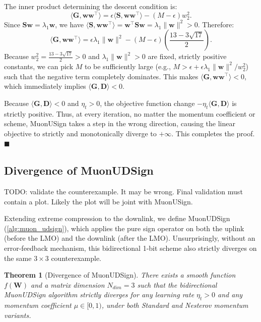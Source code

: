\documentclass[letterpaper]{article} %
\newtheorem{theorem}{Theorem}
\begin{document}
The inner product determining the descent condition is:
\begin{equation}
\langle \mathbf{G}, \mathbf{w}\mathbf{w}^\top \rangle = \epsilon \langle \mathbf{S}, \mathbf{w}\mathbf{w}^\top \rangle - (M - \epsilon) w_2^2.
\end{equation}
Since $\mathbf{S}\mathbf{w} = \lambda_1 \mathbf{w}$, we have $\langle \mathbf{S}, \mathbf{w}\mathbf{w}^\top \rangle = \mathbf{w}^\top \mathbf{S} \mathbf{w} = \lambda_1 \|\mathbf{w}\|^2 > 0$. Therefore:
\begin{equation}
\langle \mathbf{G}, \mathbf{w}\mathbf{w}^\top \rangle = \epsilon \lambda_1 \|\mathbf{w}\|^2 - (M - \epsilon) \left(\frac{13-3\sqrt{17}}{2}\right).
\end{equation}
Because $w_2^2 = \frac{13-3\sqrt{17}}{2} > 0$ and $\lambda_1 \|\mathbf{w}\|^2 > 0$ are fixed, strictly positive constants, we can pick $M$ to be sufficiently large (e.g., $M > \epsilon + \epsilon \lambda_1 \|\mathbf{w}\|^2 / w_2^2$) such that the negative term completely dominates. This makes $\langle \mathbf{G}, \mathbf{w}\mathbf{w}^\top \rangle < 0$, which immediately implies $\langle \mathbf{G}, \mathbf{D} \rangle < 0$.

Because $\langle \mathbf{G}, \mathbf{D} \rangle < 0$ and $\eta_t > 0$, the objective function change $-\eta_t \langle \mathbf{G}, \mathbf{D} \rangle$ is strictly positive. Thus, at every iteration, no matter the momentum coefficient or scheme, MuonUSign takes a step in the wrong direction, causing the linear objective to strictly and monotonically diverge to $+\infty$. This completes the proof. $\blacksquare$


\subsection{Divergence of MuonUDSign}\label{app:proof_th3}
TODO: validate the counterexample. It may be wrong. Final validation must contain a plot. Likely the plot will be joint with MuonUSign.

Extending extreme compression to the downlink, we define MuonUDSign (\cref{alg:muon_udsign}), which applies the pure sign operator on both the uplink (before the LMO) and the downlink (after the LMO). Unsurprisingly, without an error-feedback mechanism, this bidirectional 1-bit scheme also strictly diverges on the same $3 \times 3$ counterexample.

\begin{theorem}[Divergence of MuonUDSign]\label{th:3}
There exists a smooth function $f(\mathbf{W})$ and a matrix dimension $N_{dim} = 3$ such that the bidirectional MuonUDSign algorithm strictly diverges for any learning rate $\eta_t > 0$ and any momentum coefficient $\mu \in [0, 1)$, under both Standard and Nesterov momentum variants.
\end{theorem}
\end{document}
